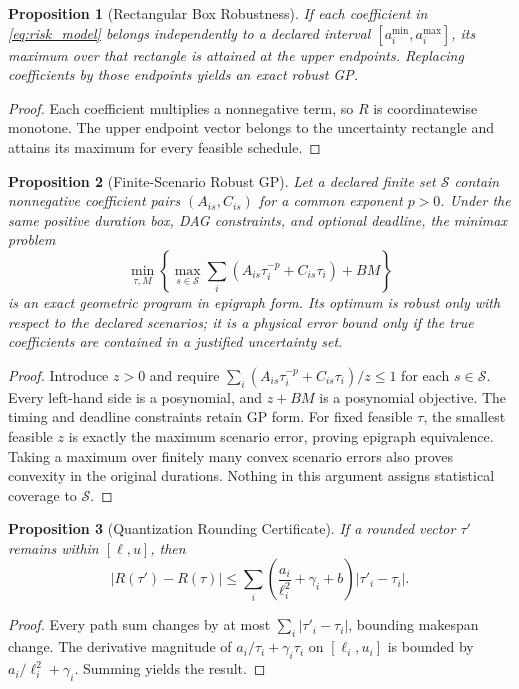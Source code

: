 \documentclass[10pt,letterpaper,journal]{IEEEtran}
\newtheorem{proposition}{Proposition}
\begin{document}
\begin{proposition}[Rectangular Box Robustness]
If each coefficient in \eqref{eq:risk_model} belongs independently to a declared interval $[a_i^{\min}, a_i^{\max}]$, its maximum over that rectangle is attained at the upper endpoints. Replacing coefficients by those endpoints yields an exact robust GP.
\end{proposition}
\begin{proof}
Each coefficient multiplies a nonnegative term, so $R$ is coordinatewise monotone. The upper endpoint vector belongs to the uncertainty rectangle and attains its maximum for every feasible schedule.
\end{proof}

\begin{proposition}[Finite-Scenario Robust GP]\label{prop:scenario}
Let a declared finite set $\mathcal S$ contain nonnegative coefficient pairs $(A_{is},C_{is})$ for a common exponent $p>0$. Under the same positive duration box, DAG constraints, and optional deadline, the minimax problem
\begin{equation}
\min_{\tau,M}\left\{\max_{s\in\mathcal S}\sum_i(A_{is}\tau_i^{-p}+C_{is}\tau_i)+BM\right\}
\end{equation}
is an exact geometric program in epigraph form. Its optimum is robust only with respect to the \emph{declared} scenarios; it is a physical error bound only if the true coefficients are contained in a justified uncertainty set.
\end{proposition}
\begin{proof}
Introduce $z>0$ and require $\sum_i(A_{is}\tau_i^{-p}+C_{is}\tau_i)/z\le1$ for each $s\in\mathcal S$. Every left-hand side is a posynomial, and $z+BM$ is a posynomial objective. The timing and deadline constraints retain GP form. For fixed feasible $\tau$, the smallest feasible $z$ is exactly the maximum scenario error, proving epigraph equivalence. Taking a maximum over finitely many convex scenario errors also proves convexity in the original durations. Nothing in this argument assigns statistical coverage to $\mathcal S$.
\end{proof}

\begin{proposition}[Quantization Rounding Certificate]
If a rounded vector $\tau'$ remains within $[\ell, u]$, then
\begin{equation}
|R(\tau') - R(\tau)| \le \sum_i \left( \frac{a_i}{\ell_i^2} + \gamma_i + b \right) |\tau'_i - \tau_i|.
\end{equation}
\end{proposition}
\begin{proof}
Every path sum changes by at most $\sum_i |\tau'_i - \tau_i|$, bounding makespan change. The derivative magnitude of $a_i/\tau_i + \gamma_i\tau_i$ on $[\ell_i, u_i]$ is bounded by $a_i/\ell_i^2 + \gamma_i$. Summing yields the result.
\end{proof}
\end{document}
